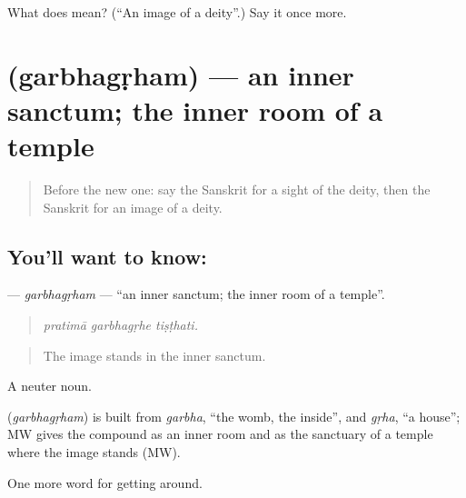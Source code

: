 \begin{tcolorbox}[breakable,colback=teal!4,colframe=teal!35!black,title={Before you move on}]
What does  mean? (\textquotedblleft{}An image of a deity\textquotedblright{}.) Say it once more.
\end{tcolorbox}
\section[\texorpdfstring{\sk{गर्भगृहम्} (garbhagṛham)}{गर्भगृहम् (garbhagṛham)}]{ (garbhagṛham) — an inner sanctum; the inner room of a temple}

\label{lesson:SA-C396-garbhagrham}



\begin{quote}
Before the new one: say the Sanskrit for a sight of the deity, then the Sanskrit for an image of a deity.
\end{quote}

\subsection*{You'll want to know: }
\textbf{} — \emph{garbhagṛham} — \textquotedblleft{}an inner sanctum; the inner room of a temple\textquotedblright{}.

\begin{quote}
  
\end{quote}

\begin{quote}
\emph{pratimā garbhagṛhe tiṣṭhati.}
\end{quote}

\begin{quote}
The image stands in the inner sanctum.
\end{quote}

A neuter noun.

\begin{cousinweb}
\textbf{} (\emph{garbhagṛham}) is built from \emph{garbha}, \textquotedblleft{}the womb, the inside\textquotedblright{}, and \emph{gṛha}, \textquotedblleft{}a house\textquotedblright{}; MW gives the compound as an inner room and as the sanctuary of a temple where the image stands (MW).
\end{cousinweb}

\begin{grammarlens}[title={What you've built}]
One more word for getting around.
\end{grammarlens}

